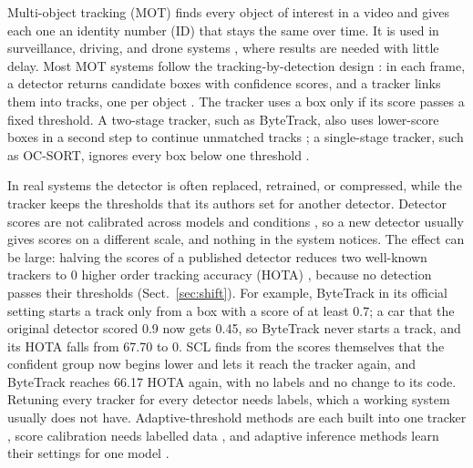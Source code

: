 \documentclass[pdflatex,sn-mathphys-num,iicol]{sn-jnl}
\newcommand{\scl}{SCL}
\begin{document}
Multi-object tracking (MOT) finds every object of interest in a video and gives each one an
identity number (ID) that stays the same over time. It is used in surveillance, driving, and drone
systems \cite{zhu2022visdrone}, where results are needed with little delay. Most
MOT systems follow the tracking-by-detection design \cite{adzemovic2026survey}: in each frame, a
detector returns candidate boxes with confidence scores, and a tracker links them into tracks, one
per object \cite{bewley2016sort,zhang2022bytetrack,cao2023ocsort}. The tracker uses a box only if
its score passes a fixed threshold. A two-stage tracker, such as ByteTrack, also uses lower-score
boxes in a second step to continue unmatched tracks \cite{zhang2022bytetrack}; a single-stage
tracker, such as OC-SORT, ignores every box below one threshold \cite{cao2023ocsort}.

In real systems the detector is often replaced, retrained, or compressed, while the tracker keeps
the thresholds that its authors set for another detector. Detector scores are not calibrated across
models and conditions \cite{kuppers2020detcalib}, so a new detector usually gives scores on a
different scale, and nothing in the system notices. The effect can be large: halving the scores of
a published detector reduces two well-known trackers to 0 higher order tracking accuracy (HOTA)
\cite{luiten2021hota}, because no detection passes their thresholds (Sect.~\ref{sec:shift}). For example, ByteTrack in
its official setting starts a track only from a box with a score of at least 0.7; a car that the
original detector scored 0.9 now gets 0.45, so ByteTrack never starts a track, and its HOTA falls
from 67.70 to 0. \scl{} finds from the scores themselves that the confident group now begins
lower and lets it reach the tracker again, and ByteTrack reaches 66.17 HOTA again, with no labels and no change to its code.
Retuning every tracker for every detector needs labels, which a working system usually does not
have. Adaptive-threshold methods are each built into one tracker
\cite{ma2023adaptivebytetrack,shim2024adaptrack,act2026adaptive}, score calibration needs
labelled data \cite{kuppers2020detcalib}, and adaptive inference methods learn their settings for
one model \cite{han2022dynamic}.
\end{document}
